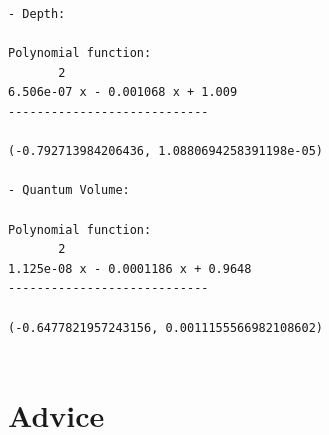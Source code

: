 \begin{itemize}
\begin{verbatim}
- Depth:

Polynomial function:
	   2
6.506e-07 x - 0.001068 x + 1.009
----------------------------

(-0.792713984206436, 1.0880694258391198e-05)

- Quantum Volume:

Polynomial function:
	   2
1.125e-08 x - 0.0001186 x + 0.9648
----------------------------

(-0.6477821957243156, 0.0011155566982108602)


\end{verbatim}
\end{itemize}

\section*{Advice}
\label{sec:org62947ed}
